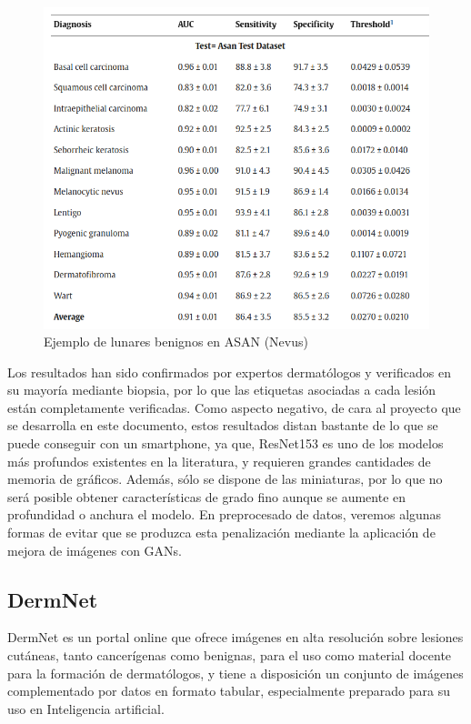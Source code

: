 \begin{figure}[H]
	\centering
	\includegraphics[scale = 0.4]{imagenes/results_asan.png}
	\caption{Ejemplo de lunares benignos en ASAN (Nevus)}
\end{figure}

Los resultados han sido confirmados por expertos dermatólogos y verificados en su mayoría mediante biopsia, por lo que las etiquetas asociadas a cada lesión están completamente verificadas. Como aspecto negativo, de cara al proyecto que se desarrolla en este documento, estos resultados distan bastante de lo que se puede conseguir con un smartphone, ya que, ResNet153 es uno de los modelos más profundos existentes en la literatura, y requieren grandes cantidades de memoria de gráficos. Además, sólo se dispone de las miniaturas, por lo que no será posible obtener características de grado fino aunque se aumente en profundidad o anchura el modelo. En preprocesado de datos, veremos algunas formas de evitar que se produzca esta penalización mediante la aplicación de mejora de imágenes con GANs.

\subsection{DermNet}

DermNet \cite{dermnetz} es un portal online que ofrece imágenes en alta resolución sobre lesiones cutáneas, tanto cancerígenas como benignas, para el uso como material docente para la formación de dermatólogos, y tiene a disposición un conjunto de imágenes complementado por datos en formato tabular, especialmente preparado para su uso en Inteligencia artificial.

